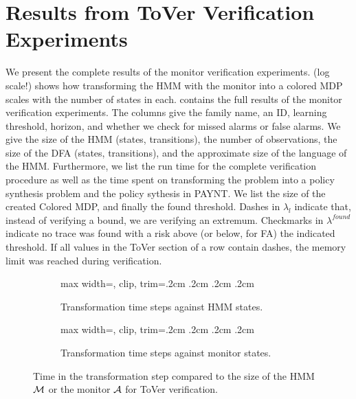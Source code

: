 \documentclass[runningheads]{llncs}
\newcommand{\alg}{ToVer\xspace}
\begin{document}
\section{Results from \alg Verification Experiments} \label{sec:resverify}
We present the complete results of the monitor verification experiments.  (log scale!) shows how transforming the HMM with the monitor into a colored MDP scales with the number of states in each.  contains the full results of the monitor verification experiments. The columns give the family name, an ID, learning threshold, horizon, and whether we check for missed alarms or false alarms. We give the size of the HMM (states, transitions), the number of observations, the size of the DFA (states, transitions), and the approximate size of the language of the HMM. Furthermore, we list the run time for the complete verification procedure as well as the time spent on transforming the problem into a policy synthesis problem and the policy sythesis in PAYNT. We list the size of the created Colored MDP, and finally the found threshold. Dashes in $\lambda_l$ indicate that, instead of verifying a bound, we are verifying an extremum. Checkmarks in $\lambda^{found}$ indicate no trace was found with a risk above (or below, for FA) the indicated threshold. If all values in the \alg section of a row contain dashes, the memory limit was reached during verification.


\begin{figure}[t]
    \begin{subfigure}{0.48\linewidth}
        \begin{adjustbox}{max width=\linewidth, clip, trim=.2cm .2cm .2cm .2cm}
            
        \end{adjustbox}
        \caption{Transformation time steps against HMM states.}
    \end{subfigure}\hfill
    \begin{subfigure}{0.48\linewidth}
        \begin{adjustbox}{max width=\linewidth, clip, trim=.2cm .2cm .2cm .2cm}
            
        \end{adjustbox}
        \caption{Transformation time steps against monitor states.}
    \end{subfigure}
    \caption{Time in the transformation step compared to the size of the HMM $\mathcal{M}$ or the monitor $\mathcal{A}$ for \alg verification.}
    \label{fig:sizevsprod}
\end{figure}
\end{document}

